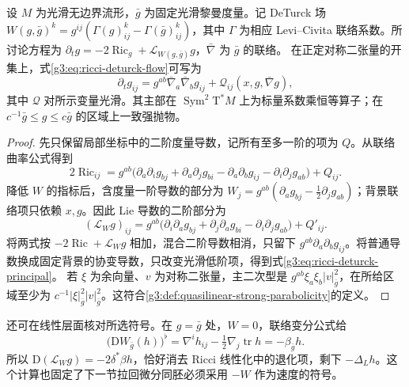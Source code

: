 \begin{proposition}\label{g3:prop:ricci-deturck-parabolic}
	设 \(M\) 为光滑无边界流形，\(\bar g\) 为固定光滑黎曼度量。记 DeTurck 场 \(W(g,\bar g)^k=g^{ij}(\Gamma(g)^k_{ij}-\Gamma(\bar g)^k_{ij})\)，其中 \(\Gamma\) 为相应 Levi--Civita 联络系数。所讨论方程为 \(\partial_tg=-2\operatorname{Ric}_g+\mathcal L_{W(g,\bar g)}g\)，\(\bar\nabla\) 为 \(\bar g\) 的联络。
	在正定对称二张量的开集上，式\eqref{g3:eq:ricci-deturck-flow}可写为
	\begin{equation}\label{g3:eq:ricci-deturck-principal}
		\partial_tg_{ij}
		=g^{ab}\bar\nabla_a\bar\nabla_b g_{ij}
		+\mathcal Q_{ij}(x,g,\bar\nabla g),
	\end{equation}
	其中 \(\mathcal Q\) 对所示变量光滑。其主部在 \(\operatorname{Sym}^2\mathrm T^*M\) 上为标量系数乘恒等算子；在 \(c^{-1}\bar g\le g\le c\bar g\) 的区域上一致强抛物。
\end{proposition}
\begin{proof}
	先只保留局部坐标中的二阶度量导数，记所有至多一阶的项为 \(Q\)。从联络曲率公式得到
	\[
		2\operatorname{Ric}_{ij}
		=g^{ab}\bigl(\partial_a\partial_i g_{bj}
		+\partial_a\partial_j g_{bi}-\partial_a\partial_b g_{ij}
		-\partial_i\partial_j g_{ab}\bigr)+Q_{ij}.
	\]
	降低 \(W\) 的指标后，含度量一阶导数的部分为
	\(W_j=g^{ab}(\partial_a g_{bj}-\tfrac12\partial_jg_{ab})\)；背景联络项只依赖 \(x,g\)。因此 Lie 导数的二阶部分为
	\[
		(\mathcal L_Wg)_{ij}
		=g^{ab}\bigl(\partial_i\partial_a g_{bj}
		+\partial_j\partial_a g_{bi}-\partial_i\partial_jg_{ab}\bigr)+Q'_{ij}.
	\]
	将两式按 \(-2\operatorname{Ric}+\mathcal L_Wg\) 相加，混合二阶导数相消，只留下 \(g^{ab}\partial_a\partial_b g_{ij}\)。将普通导数换成固定背景的协变导数，只改变光滑低阶项，得到式\eqref{g3:eq:ricci-deturck-principal}。
	若 \(\xi\) 为余向量、\(v\) 为对称二张量，主二次型是 \(g^{ab}\xi_a\xi_b|v|_{\bar g}^2\)，在所给区域至少为 \(c^{-1}|\xi|_{\bar g}^2|v|_{\bar g}^2\)。这符合\cref{g3:def:quasilinear-strong-parabolicity}的定义。
\end{proof}

还可在线性层面核对所选符号。在 \(g=\bar g\) 处，\(W=0\)，联络变分公式给
\[
	\bigl(\mathrm DW_{\bar g}(h)\bigr)^\flat
	=\nabla^ih_{ij}-\tfrac12\nabla_j\operatorname{tr}h
	=-\beta_{\bar g}h.
\]
所以 \(\mathrm D(\mathcal L_Wg)=-2\delta^*\beta h\)，恰好消去 Ricci 线性化中的退化项，剩下 \(-\Delta_Lh\)。这个计算也固定了下一节拉回微分同胚必须采用 \(-W\) 作为速度的符号。
